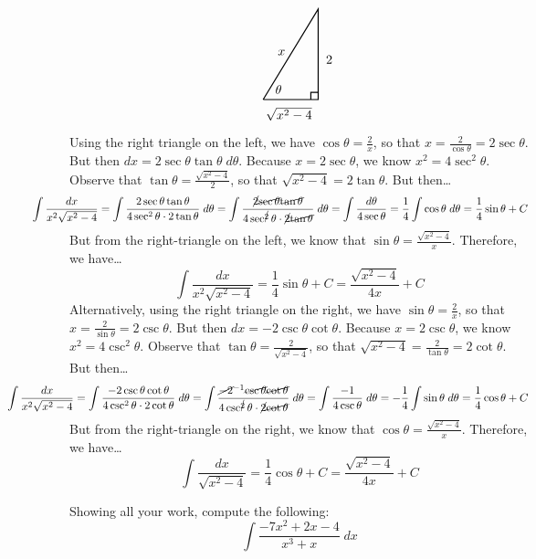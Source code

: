 \documentclass[12pt,letterpaper]{exam}
\begin{document}
\begin{questions}
{\[\begin{tikzpicture}
	\draw[line width=0.03cm] (0,0) -- (1.5,0) -- (1.5,2.5) -- (0,0);
	\draw[line width=0.03cm] (1.3,0) -- (1.3,0.2) -- (1.5,0.2);
	\node at (1.8,1.1) {$2$};
	\node at (0.7,-0.4) {$\sqrt{x^2 - 4}$};
	\node at (0.5,1.3) {$x$};
	\node at (0.42,0.28) {$\theta$};
	\end{tikzpicture}
	\]
Using the right triangle on the left, we have $\cos \theta= \frac{2}{x}$, so that $x= \frac{2}{\cos \theta}= 2 \sec \theta$. But then $dx= 2 \sec \theta \tan \theta \;d\theta$. Because $x= 2 \sec \theta$, we know $x^2= 4 \sec^2 \theta$. Observe that $\tan \theta= \frac{\sqrt{x^2 - 4}}{2}$, so that $\sqrt{x^2 - 4}= 2 \tan \theta$. But then\dots
	\[
	\hspace{-1.2cm}\int \dfrac{dx}{x^2\sqrt{x^2 - 4}}= \int \dfrac{2 \sec \theta \tan \theta}{4 \sec^2 \theta \cdot 2 \tan \theta} \;d\theta= \int \dfrac{\cancel{2} \cancel{\sec \theta} \cancel{\tan \theta}}{4 \sec^{\cancel{2}} \theta \cdot \cancel{2} \cancel{\tan \theta}} \;d\theta= \int \dfrac{d\theta}{4 \sec \theta}= \dfrac{1}{4} \int \cos \theta \;d\theta= \dfrac{1}{4} \sin \theta + C
	\]
But from the right-triangle on the left, we know that $\sin \theta= \frac{\sqrt{x^2 - 4}}{x}$. Therefore, we have\dots
	\[
	\int \dfrac{dx}{x^2\sqrt{x^2 - 4}}= \dfrac{1}{4} \sin \theta + C= \boxed{\frac{\sqrt{x^2 - 4}}{4x} + C}
	\] \pspace
Alternatively, using the right triangle on the right, we have $\sin \theta= \frac{2}{x}$, so that $x= \frac{2}{\sin \theta}= 2 \csc \theta$. But then $dx= -2 \csc \theta \cot \theta$. Because $x= 2 \csc \theta$, we know $x^2= 4 \csc^2 \theta$. Observe that $\tan \theta= \frac{2}{\sqrt{x^2 - 4}}$, so that $\sqrt{x^2 - 4}= \frac{2}{\tan \theta}= 2 \cot \theta$. But then\dots
	\[
	\hspace{-2cm}\int \dfrac{dx}{x^2\sqrt{x^2 - 4}}= \int \dfrac{-2 \csc \theta \cot \theta}{4 \csc^2 \theta \cdot 2 \cot \theta} \;d\theta= \int \dfrac{\cancel{-2}^{-1} \cancel{\csc \theta} \cancel{\cot \theta}}{4 \csc^{\cancel{2}} \theta \cdot \cancel{2} \cancel{\cot \theta}} \;d\theta= \int \dfrac{-1}{4 \csc \theta} \;d\theta= -\dfrac{1}{4} \int \sin \theta \;d\theta= \dfrac{1}{4} \cos \theta + C
	\]
But from the right-triangle on the right, we know that $\cos\theta= \frac{\sqrt{x^2 - 4}}{x}$. Therefore, we have\dots
	\[
	\int \dfrac{dx}{\sqrt{x^2 - 4}}= \dfrac{1}{4} \cos \theta + C= \boxed{\frac{\sqrt{x^2 - 4}}{4x} + C}
	\]
}



\newpage
\question[15] Showing all your work, compute the following:
	\[
	\int \dfrac{-7x^2 + 2x - 4}{x^3 + x} \;dx
	\] \pspace


\end{questions}
\end{document}
